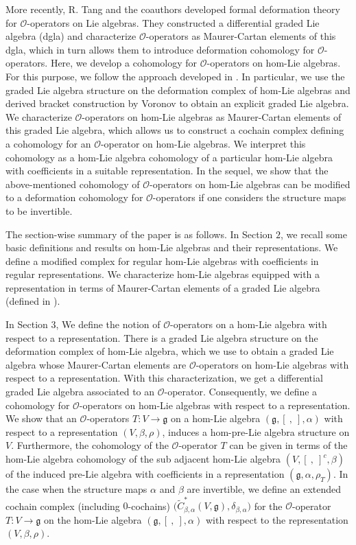 \documentclass[a4paper,11pt]{amsart}
\theoremstyle{plain}
\theoremstyle{definition}
\theoremstyle{remark}
\numberwithin{equation}{section}
\begin{document}
More recently, R. Tang and the coauthors \cite{Sheng3} developed formal deformation theory for $\mathcal{O}$-operators on Lie algebras. They constructed a differential graded Lie algebra (dgla) and characterize $\mathcal{O}$-operators as Maurer-Cartan elements of this dgla, which in turn allows them to introduce deformation cohomology for $\mathcal{O}$-operators. Here, we develop a cohomology for $\mathcal{O}$-operators on hom-Lie algebras. For this purpose, we follow the approach developed in \cite{Sheng3}. In particular, we use the graded Lie algebra structure on the deformation complex of hom-Lie algebras \cite{DefHLIE} and derived bracket construction by Voronov \cite{Voronov} to obtain an explicit graded Lie algebra. We characterize $\mathcal{O}$-operators on hom-Lie algebras as Maurer-Cartan elements of this graded Lie algebra, which allows us to construct a cochain complex defining a cohomology for an $\mathcal{O}$-operator on hom-Lie algebras. We interpret this cohomology as a hom-Lie algebra cohomology of a particular hom-Lie algebra with coefficients in a suitable representation. In the sequel, we show that the above-mentioned cohomology of $\mathcal{O}$-operators on hom-Lie algebras can be modified to a deformation cohomology for $\mathcal{O}$-operators if one considers the structure maps to be invertible.

The section-wise summary of the paper is as follows.
In Section $2$, we recall some basic definitions and results on hom-Lie algebras and their representations. We define a modified complex for regular hom-Lie algebras with coefficients in regular representations. We characterize hom-Lie algebras equipped with a representation in terms of Maurer-Cartan elements of a graded Lie algebra (defined in \cite{DefHLIE}).
 
In Section $3$, We define the notion of $\mathcal{O}$-operators on a hom-Lie algebra with respect to a representation. There is a graded Lie algebra structure on the deformation complex of hom-Lie algebra, which we use to obtain a graded Lie algebra whose Maurer-Cartan elements are $\mathcal{O}$-operators on hom-Lie algebras with respect to a representation. With this characterization, we get a differential graded Lie algebra associated to an $\mathcal{O}$-operator. Consequently, we define a cohomology for $\mathcal{O}$-operators on hom-Lie algebras with respect to a representation. We show that an $\mathcal{O}$-operators $T:V\rightarrow \mathfrak{g}$ on a hom-Lie algebra $(\mathfrak{g},[~,~],\alpha)$ with respect to a representation $(V,\beta,\rho)$, induces a hom-pre-Lie algebra structure on $V$. Furthermore, the cohomology of the $\mathcal{O}$-operator $T$ can be given in terms of the hom-Lie algebra cohomology of the sub adjacent hom-Lie algebra $(V,[~,~]^c,\beta)$ of the induced pre-Lie algebra with coefficients in a representation $(\mathfrak{g},\alpha,\rho_T)$. In the case when the structure maps $\alpha$ and $\beta$ are invertible, we define an extended cochain complex (including $0$-cochains) $\big(\widetilde{C}^*_{\beta,\alpha}(V,\mathfrak{g}),\delta_{\beta,\alpha}\big)$ for the $\mathcal{O}$-operator $T:V\rightarrow \mathfrak{g}$ on the hom-Lie algebra $(\mathfrak{g},[~,~],\alpha)$ with respect to the representation $(V,\beta,\rho)$.   
\end{document}
